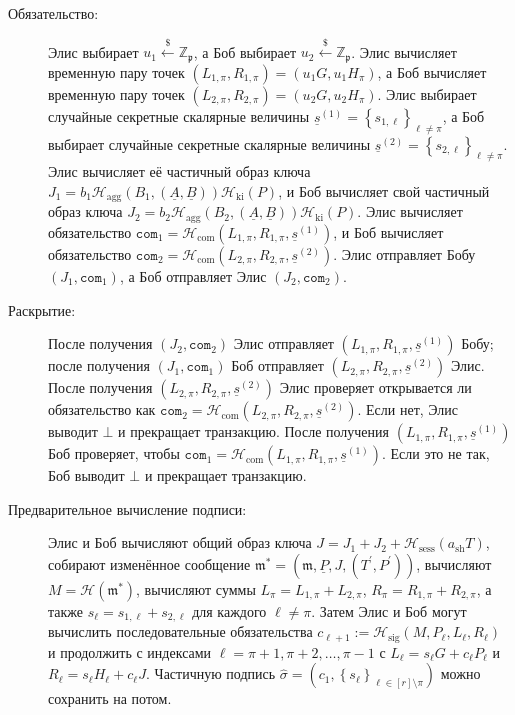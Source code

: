 \documentclass{mrl}
\theoremstyle{definition}
\numberwithin{theorem}{subsection}
\newcommand{\bbz}{\mathbb{Z}}
\newcommand{\p}{\mathfrak{p}}
\newcommand{\m}{\mathfrak{m}}
\begin{document}
\begin{description}
\item [Обязательство:] Элис выбирает $u_1 \overset{\$}{\leftarrow} \bbz_\p$, а Боб выбирает $u_2 \overset{\$}{\leftarrow} \bbz_\p$. Элис вычисляет временную пару точек $(L_{1, \pi}, R_{1,\pi}) = (u_1 G, u_1 H_\pi)$, а Боб вычисляет временную пару точек $(L_{2, \pi}, R_{2,\pi}) = (u_2 G, u_2 H_\pi)$. Элис выбирает случайные секретные скалярные величины $\underline{s}^{(1)} = \left\{s_{1, \ell}\right\}_{\ell \neq \pi}$, а Боб выбирает случайные секретные скалярные величины $\underline{s}^{(2)} = \left\{s_{2,\ell}\right\}_{\ell \neq \pi}$. Элис вычисляет её частичный образ ключа $J_1 = b_1 \mathcal{H}_{\text{agg}}(B_1, (\underline{A}, \underline{B}))\mathcal{H}_{\text{ki}}(P)$, и Боб вычисляет свой частичный образ ключа $J_2 = b_2 \mathcal{H}_{\text{agg}}(B_2, (\underline{A}, \underline{B}))\mathcal{H}_{\text{ki}}(P)$. Элис вычисляет обязательство $\texttt{com}_1 = \mathcal{H}_{\text{com}}(L_{1,\pi}, R_{1,\pi}, \underline{s}^{(1)})$, и Боб вычисляет обязательство $\texttt{com}_2 = \mathcal{H}_{\text{com}}(L_{2,\pi}, R_{2,\pi}, \underline{s}^{(2)})$. Элис отправляет Бобу $(J_1, \texttt{com}_1)$, а Боб отправляет Элис $(J_2,\texttt{com}_2)$.

\item [Раскрытие:] После получения $(J_2, \texttt{com}_2)$ Элис отправляет $(L_{1,\pi}, R_{1,\pi}, \underline{s}^{(1)})$ Бобу; после получения \linebreak $(J_1, \texttt{com}_1)$ Боб отправляет $(L_{2,\pi}, R_{2,\pi}, \underline{s}^{(2)})$ Элис. После получения $(L_{2,\pi}, R_{2,\pi}, \underline{s}^{(2)})$ Элис проверяет открывается ли обязательство как $\texttt{com}_2 = \mathcal{H}_{\text{com}}(L_{2,\pi}, R_{2,\pi}, \underline{s}^{(2)})$. Если нет, Элис выводит $\bot$ и прекращает транзакцию. После получения $(L_{1,\pi}, R_{1,\pi}, \underline{s}^{(1)})$ Боб проверяет, чтобы $\texttt{com}_1 = \mathcal{H}_{\text{com}}(L_{1,\pi}, R_{1,\pi}, \underline{s}^{(1)})$. Если это не так, Боб выводит $\bot$ и прекращает транзакцию.

\item [Предварительное вычисление подписи:] Элис и Боб вычисляют общий образ ключа $J = J_1 + J_2 + \mathcal{H}_{\text{sess}}(a_{\text{sh}}T)$, собирают изменённое сообщение $\m^* = (\m, \underline{P}, J, (T^{\prime}, P^{\prime}))$, вычисляют $M = \mathcal{H}(\m^*)$, вычисляют суммы $L_\pi = L_{1,\pi} + L_{2,\pi}$, $R_\pi = R_{1,\pi} + R_{2,\pi}$, а также $s_\ell = s_{1,\ell} + s_{2, \ell}$ для каждого $\ell \neq \pi$. Затем Элис и Боб могут вычислить последовательные обязательства $c_{\ell+1} := \mathcal{H}_{\text{sig}}(M,P_\ell, L_{\ell}, R_{\ell})$ и продолжить с индексами $\ell=\pi+1, \pi+2, \ldots, \pi-1$ с $L_\ell = s_\ell G + c_\ell P_\ell$ и $R_\ell = s_\ell H_\ell + c_\ell J$. Частичную подпись $\widehat{\sigma} = (c_1, \left\{s_\ell\right\}_{\ell \in [r] \setminus \pi})$ можно сохранить на потом.


\end{description}
\end{document}

